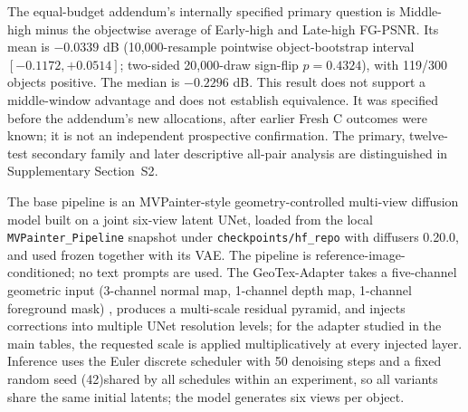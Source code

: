 \documentclass[times,twocolumn,final]{elsarticle}
\providecommand{\DIFadd}[1]{{\protect\color{blue} \sf #1}} %
\providecommand{\DIFdel}[1]{{\protect\color{red} \scriptsize #1}} %
\providecommand{\DIFaddend}{} %
\providecommand{\DIFdelbegin}{} %
\begin{document}
\DIFadd{The equal-budget addendum's internally specified primary question is Middle-high minus the objectwise average of Early-high and Late-high FG-PSNR. Its mean is $-0.0339$ dB (10,000-resample pointwise object-bootstrap interval $[-0.1172,+0.0514]$; two-sided 20,000-draw sign-flip $p=0.4324$), with 119/300 objects positive. The median is $-0.2296$ dB. This result does not support a middle-window advantage and does not establish equivalence. It was specified before the addendum's new allocations, after earlier Fresh C outcomes were known; it is not an independent prospective confirmation. The primary, twelve-test secondary family and later descriptive all-pair analysis are distinguished in Supplementary Section~S2}\DIFaddend .

The \DIFdelbegin \DIFdel{base pipeline is an MVPainter-style geometry-controlled multi-view diffusion model built on a joint six-view latent UNet, loaded from the local \texttt{MVPainter\_Pipeline} snapshot under \texttt{checkpoints/hf\_repo} with diffusers 0.20.0, and used frozen together with its VAE. The pipeline is reference-image-conditioned; no text prompts are used. The GeoTex-Adapter takes a five-channel geometric input (3-channel normal map, 1-channel depth map, 1-channel foreground mask) , produces a multi-scale residual pyramid, and injects corrections into multiple UNet resolution levels; for the adapter studied in the main tables, the requested scale is applied multiplicatively at every injected layer. Inference uses the Euler discrete scheduler with 50 denoising steps and a fixed random seed (42)shared by all schedules within an experiment, so all variants share the same initial latents; the model generates six views per object. }%
\end{document}
